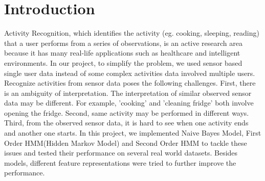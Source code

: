 \documentclass[10pt,letter]{article}
\numberwithin{equation}{section} %
\numberwithin{figure}{section} %
\numberwithin{table}{section} %
\begin{document}
\section{Introduction}
Activity Recognition, which identifies the activity (eg. cooking, sleeping, reading) that a user performs from a series of observations, is an active research area because it has many real-life applications such as healthcare and intelligent environments. In our project, to simplify the problem, we used sensor based single user data instead of some complex activities data involved multiple users. Recognize activities from sensor data poses the following challenges. First, there is an ambiguity of interpretation. The interpretation of similar observed sensor data may be different. For example, 'cooking' and 'cleaning fridge' both involve opening the fridge. Second, same activity may be performed in different ways. Third, from the observed sensor data, it is hard to see when one activity ends and another one starts. In this project, we implemented Naive Bayes Model, First Order HMM(Hidden Markov Model) and Second Order HMM to tackle these issues and tested their performance on several real world datasets. Besides models, different feature representations were tried to further improve the performance. 
\end{document}
